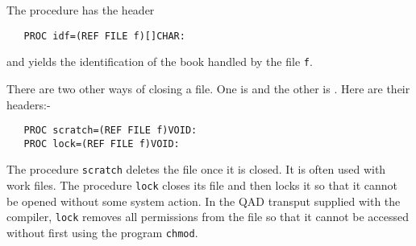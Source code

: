 The procedure  has the header
\begin{verbatim}
   PROC idf=(REF FILE f)[]CHAR:
\end{verbatim}
\noindent
and yields the identification of the book handled by the file \verb|f|.

There are two other ways of closing a file. One is  and
the other is . Here are their headers:-
\begin{verbatim}
   PROC scratch=(REF FILE f)VOID:
   PROC lock=(REF FILE f)VOID:
\end{verbatim}
\noindent
The procedure \texttt{scratch} deletes the file once it is closed. It
is often used with work files. The procedure \texttt{lock} closes its
file and then locks it so that it cannot be opened without some
system action. In the QAD transput supplied with the
compiler, \texttt{lock} removes all permissions from the file so
that it cannot be accessed without first using the program
\texttt{chmod}.

